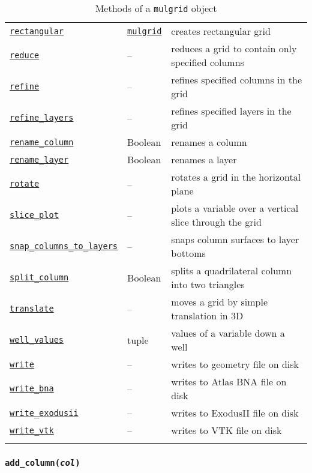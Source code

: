 \begin{center}
\begin{longtable}{|l|l|p{70mm}|}
  \hyperref[sec:mulgrid:rectangular]{\texttt{rectangular}} & \hyperref[mulgrids]{\texttt{mulgrid}} & creates rectangular grid\\
  \hyperref[sec:mulgrid:reduce]{\texttt{reduce}} & -- & reduces a grid to contain only specified columns\\
  \hyperref[sec:mulgrid:refine]{\texttt{refine}} & -- & refines specified columns in the grid\\
  \hyperref[sec:mulgrid:refine_layers]{\texttt{refine\_layers}} & -- & refines specified layers in the grid\\
  \hyperref[sec:mulgrid:rename_column]{\texttt{rename\_column}} & Boolean & renames a column\\
  \hyperref[sec:mulgrid:rename_layer]{\texttt{rename\_layer}} & Boolean & renames a layer\\
  \hyperref[sec:mulgrid:rotate]{\texttt{rotate}} & -- & rotates a grid in the horizontal plane\\
  \hyperref[sec:mulgrid:slice_plot]{\texttt{slice\_plot}} & -- & plots a variable over a vertical slice through the grid\\
  \hyperref[sec:mulgrid:snap_columns_to_layers]{\texttt{snap\_columns\_to\_layers}} & -- & snaps column surfaces to layer bottoms\\
  \hyperref[sec:mulgrid:split_column]{\texttt{split\_column}} & Boolean & splits a quadrilateral column into two triangles\\ 
  \hyperref[sec:mulgrid:translate]{\texttt{translate}} & -- & moves a grid by simple translation in 3D\\
  \hyperref[sec:mulgrid:well_values]{\texttt{well\_values}} & tuple & values of a variable down a well\\
  \hyperref[sec:mulgrid:write]{\texttt{write}} & -- & writes to geometry file on disk\\
  \hyperref[sec:mulgrid:write_bna]{\texttt{write\_bna}} & -- & writes to Atlas BNA file on disk\\ 
  \hyperref[sec:mulgrid:write_exodusii]{\texttt{write\_exodusii}} &  -- & writes to ExodusII file on disk\\
  \hyperref[sec:mulgrid:write_vtk]{\texttt{write\_vtk}} &  -- & writes to VTK file on disk\\
  \hline
  \caption{Methods of a \texttt{mulgrid} object}
  \label{tb:mulgrid_methods}
\end{longtable}
\end{center}

\begin{snugshade}\subsubsection{\texttt{add\_column(\emph{col})}}\end{snugshade}
\label{sec:mulgrid:add_column}

